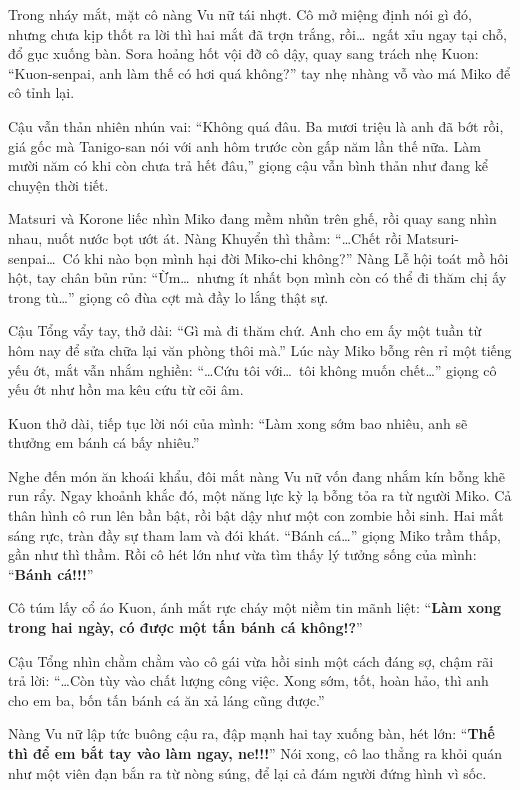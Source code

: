 \documentclass[../main.tex]{subfiles}
\begin{document}
Trong nháy mắt, mặt cô nàng Vu nữ tái nhợt. Cô mở miệng định nói gì đó, nhưng chưa kịp thốt ra lời thì hai mắt đã trợn trắng, rồi\dots\ ngất xỉu ngay tại chỗ, đổ gục xuống bàn. Sora hoảng hốt vội đỡ cô dậy, quay sang trách nhẹ Kuon: ``Kuon-senpai, anh làm thế có hơi quá không?'' tay nhẹ nhàng vỗ vào má Miko để cô tỉnh lại.

Cậu vẫn thản nhiên nhún vai: ``Không quá đâu. Ba mươi triệu là anh đã bớt rồi, giá gốc mà Tanigo-san nói với anh hôm trước còn gấp năm lần thế nữa. Làm mười năm có khi còn chưa trả hết đâu,'' giọng cậu vẫn bình thản như đang kể chuyện thời tiết.

Matsuri và Korone liếc nhìn Miko đang mềm nhũn trên ghế, rồi quay sang nhìn nhau, nuốt nước bọt ướt át. Nàng Khuyển thì thầm: ``\dots Chết rồi Matsuri-senpai\dots\ Có khi nào bọn mình hại đời Miko-chi không?'' Nàng Lễ hội toát mồ hôi hột, tay chân bủn rủn: ``Ừm\dots\ nhưng ít nhất bọn mình còn có thể đi thăm chị ấy trong tù\dots'' giọng cô đùa cợt mà đầy lo lắng thật sự.

Cậu Tổng vẩy tay, thở dài: ``Gì mà đi thăm chứ. Anh cho em ấy một tuần từ hôm nay để sửa chữa lại văn phòng thôi mà.'' Lúc này Miko bỗng rên rỉ một tiếng yếu ớt, mắt vẫn nhắm nghiền: ``\dots Cứu tôi với\dots\ tôi không muốn chết\dots'' giọng cô yếu ớt như hồn ma kêu cứu từ cõi âm.

Kuon thở dài, tiếp tục lời nói của mình: ``Làm xong sớm bao nhiêu, anh sẽ thưởng em bánh cá bấy nhiêu.''

Nghe đến món ăn khoái khẩu, đôi mắt nàng Vu nữ vốn đang nhắm kín bỗng khẽ run rẩy. Ngay khoảnh khắc đó, một năng lực kỳ lạ bỗng tỏa ra từ người Miko. Cả thân hình cô run lên bần bật, rồi bật dậy như một con zombie hồi sinh. Hai mắt sáng rực, tràn đầy sự tham lam và đói khát. ``Bánh cá\dots'' giọng Miko trầm thấp, gần như thì thầm. Rồi cô hét lớn như vừa tìm thấy lý tưởng sống của mình: ``\textbf{Bánh cá!!!}''

Cô túm lấy cổ áo Kuon, ánh mắt rực cháy một niềm tin mãnh liệt: ``\textbf{Làm xong trong hai ngày, có được một tấn bánh cá không!?}''

Cậu Tổng nhìn chằm chằm vào cô gái vừa hồi sinh một cách đáng sợ, chậm rãi trả lời: ``\dots Còn tùy vào chất lượng công việc. Xong sớm, tốt, hoàn hảo, thì anh cho em ba, bốn tấn bánh cá ăn xả láng cũng được.''

Nàng Vu nữ lập tức buông cậu ra, đập mạnh hai tay xuống bàn, hét lớn: ``\textbf{Thế thì để em bắt tay vào làm ngay, ne!!!}'' Nói xong, cô lao thẳng ra khỏi quán như một viên đạn bắn ra từ nòng súng, để lại cả đám người đứng hình vì sốc.
\end{document}
